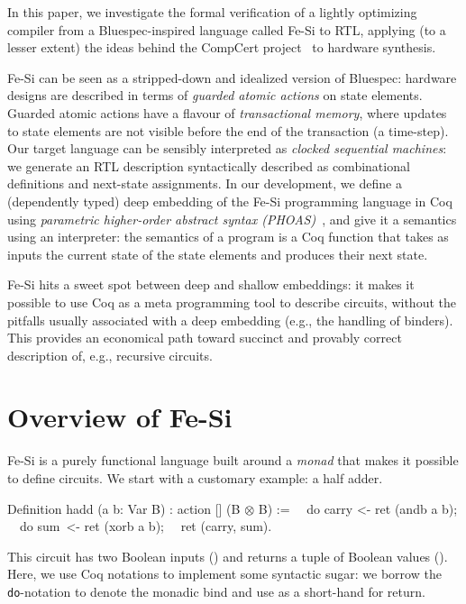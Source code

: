 \documentclass{llncs}
\newcommand{\project}{Fe-Si}
\begin{document}
\medskip In this paper, we investigate the formal verification of a
lightly optimizing compiler from a Bluespec-inspired language called
\project{} to RTL, applying (to a lesser extent) the ideas behind the
CompCert project~\cite{Leroy-backend} to hardware synthesis.

\medskip

Fe-Si can be seen as a stripped-down and idealized version of
Bluespec: hardware designs are described in terms of \emph{guarded
  atomic actions} on state elements.  
%
Guarded atomic actions have a flavour of \emph{transactional memory}, where
updates to state elements are not visible before the end of the
transaction (a time-step).
%
Our target language can be sensibly interpreted as \emph{clocked
  sequential machines}: we generate an RTL description syntactically
described as combinational definitions and next-state assignments.
%
In our development, we define a (dependently typed) deep embedding of
the Fe-Si programming language in Coq using \emph{parametric
  higher-order abstract syntax (PHOAS)}~\cite{phoas-chlipala}, and
give it a semantics using an interpreter: the semantics of a program
is a Coq function that takes as inputs the current state of the
state elements and produces their next state.

Fe-Si hits a sweet spot between deep and shallow embeddings: it makes
it possible to use Coq as a meta programming tool to describe
circuits, without the pitfalls usually associated with a deep
embedding (e.g., the handling of binders).
%
This provides an economical path toward succinct and provably correct
description of, e.g., recursive circuits.

\section{Overview of Fe-Si}
Fe-Si is a purely functional language built around a \emph{monad} that
makes it possible to define circuits. We start with a customary
example: a half adder.
\begin{mcoq}
Definition hadd (a b: Var B) : action [] (B $\otimes$ B) :=
$\quad$do carry <- ret (andb a b); 
$\quad$do sum   $\,$<- ret (xorb a b);
$\quad$ret (carry, sum).  
\end{mcoq}
This circuit has two Boolean inputs () and returns a tuple
of Boolean values ().
%
Here, we use Coq notations to implement some syntactic sugar: we
borrow the \texttt{do}-notation to denote the monadic bind and use
 as a short-hand for return. 
%  
\end{document}
